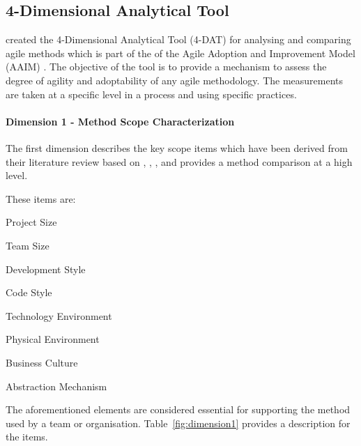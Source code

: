 \subsection{4-Dimensional Analytical Tool} %
\citet{qumer2006measuring} created the 4-Dimensional Analytical Tool (4-DAT) for analysing and comparing agile methods which is part of the of the Agile Adoption and Improvement Model (AAIM) \cite{qumerAAIM}. The objective of the tool is to provide a mechanism to assess the degree of agility and adoptability of any agile methodology. The measurements are taken at a specific level in a process and using specific practices.

\paragraph{Dimension 1 - Method Scope Characterization}
The first dimension describes the key scope items which have been derived from their literature review based on \citet{Beck:2004:EPE:1076267}, \citet{koch2005agile}, \citet{Palmer:2001:PGF:600044}, \citet{Highsmith:2000:ASD:323922} and provides a method comparison at a high level. 

These items are:
\begin{inparaenum} [a\upshape)]
\item Project Size
\item Team Size
\item Development Style
\item Code Style
\item Technology Environment
\item Physical Environment
\item Business Culture
\item Abstraction Mechanism
\end{inparaenum}

The aforementioned elements are considered essential for supporting the method used by a team or organisation. Table~\ref{fig:dimension1} provides a description for the items.

